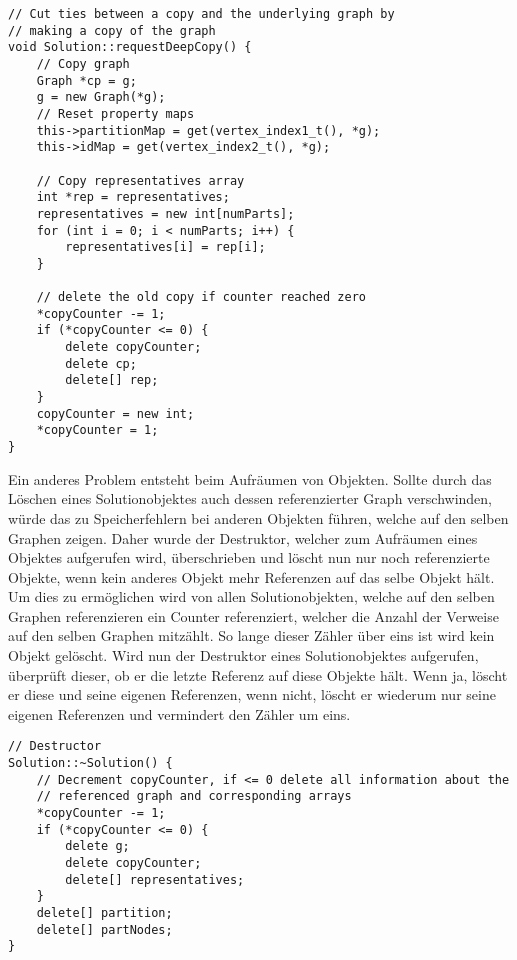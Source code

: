 \singlespacing
\begin{lstlisting}[caption={Die Methode \texttt{requestDeepCopy} der Solution Klasse},label={lst:deepcopy}]
// Cut ties between a copy and the underlying graph by 
// making a copy of the graph
void Solution::requestDeepCopy() {
	// Copy graph
	Graph *cp = g;
	g = new Graph(*g);
	// Reset property maps
	this->partitionMap = get(vertex_index1_t(), *g);
	this->idMap = get(vertex_index2_t(), *g);

	// Copy representatives array
	int *rep = representatives;
	representatives = new int[numParts];
	for (int i = 0; i < numParts; i++) {
		representatives[i] = rep[i];
	}

	// delete the old copy if counter reached zero
	*copyCounter -= 1;
	if (*copyCounter <= 0) {
		delete copyCounter;
		delete cp;
		delete[] rep;
	}
	copyCounter = new int;
	*copyCounter = 1;
}
\end{lstlisting}

Ein anderes Problem entsteht beim Aufräumen von Objekten. Sollte durch das Löschen eines Solutionobjektes auch dessen referenzierter Graph verschwinden, würde das zu Speicherfehlern bei anderen Objekten führen, 
welche auf den selben Graphen zeigen. Daher wurde der Destruktor, welcher zum Aufräumen eines Objektes aufgerufen wird, überschrieben und löscht nun nur noch referenzierte Objekte, wenn kein anderes Objekt
mehr Referenzen auf das selbe Objekt hält. Um dies zu ermöglichen wird von allen Solutionobjekten, welche auf den selben Graphen referenzieren ein Counter referenziert, welcher die Anzahl der
Verweise auf den selben Graphen mitzählt. So lange dieser Zähler über eins ist wird kein Objekt gelöscht. Wird nun der Destruktor eines Solutionobjektes aufgerufen, überprüft dieser, ob er die letzte
Referenz auf diese Objekte hält. Wenn ja, löscht er diese und seine eigenen Referenzen, wenn nicht, löscht er wiederum nur seine eigenen Referenzen und vermindert den Zähler um eins.

\singlespacing
\begin{lstlisting}[caption={Der Destruktor der Solutionklasse mit Rücksichtnahme auf eventuell ver\-blei\-ben\-de Referenzen},label={lst:destruct}]
// Destructor
Solution::~Solution() {
	// Decrement copyCounter, if <= 0 delete all information about the 
	// referenced graph and corresponding arrays
	*copyCounter -= 1;
	if (*copyCounter <= 0) {
		delete g;
		delete copyCounter;
		delete[] representatives;
	}
	delete[] partition;
	delete[] partNodes;
}
\end{lstlisting}


